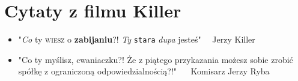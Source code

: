 \documentclass{article}
\begin{document}
\newpage
\section{Cytaty z filmu Killer}
\begin{itemize}
\item "\emph{Co} \textup{ty} \textsc{wiesz} o \textbf{zabijaniu}?! \textsl{Ty} \texttt{stara} \textit{dupa} \textsf{jesteś}"~~ Jerzy Killer 
\item "\tiny Co \scriptsize ty \footnotesize myślisz, \small cwaniaczku?! Że z \large piątego przykazania \Large możesz sobie  \LARGE zrobić spółkę z  \huge ograniczoną  \Huge odpowiedzialnością?!" \normalsize ~~ Komisarz Jerzy Ryba
\end{itemize}





\end{document}
